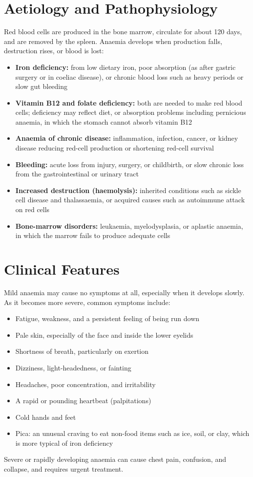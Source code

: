 \section*{Aetiology and Pathophysiology}
Red blood cells are produced in the bone marrow, circulate for about 120 days, and are removed by the spleen. Anaemia develops when production falls, destruction rises, or blood is lost:
\begin{itemize}
    \item \textbf{Iron deficiency:} from low dietary iron, poor absorption (as after gastric surgery or in coeliac disease), or chronic blood loss such as heavy periods or slow gut bleeding
    \item \textbf{Vitamin B12 and folate deficiency:} both are needed to make red blood cells; deficiency may reflect diet, or absorption problems including pernicious anaemia, in which the stomach cannot absorb vitamin B12
    \item \textbf{Anaemia of chronic disease:} inflammation, infection, cancer, or kidney disease reducing red-cell production or shortening red-cell survival
    \item \textbf{Bleeding:} acute loss from injury, surgery, or childbirth, or slow chronic loss from the gastrointestinal or urinary tract
    \item \textbf{Increased destruction (haemolysis):} inherited conditions such as sickle cell disease and thalassaemia, or acquired causes such as autoimmune attack on red cells
    \item \textbf{Bone-marrow disorders:} leukaemia, myelodysplasia, or aplastic anaemia, in which the marrow fails to produce adequate cells
\end{itemize}

\section*{Clinical Features}
Mild anaemia may cause no symptoms at all, especially when it develops slowly. As it becomes more severe, common symptoms include:
\begin{itemize}
    \item Fatigue, weakness, and a persistent feeling of being run down
    \item Pale skin, especially of the face and inside the lower eyelids
    \item Shortness of breath, particularly on exertion
    \item Dizziness, light-headedness, or fainting
    \item Headaches, poor concentration, and irritability
    \item A rapid or pounding heartbeat (palpitations)
    \item Cold hands and feet
    \item Pica: an unusual craving to eat non-food items such as ice, soil, or clay, which is more typical of iron deficiency
\end{itemize}
Severe or rapidly developing anaemia can cause chest pain, confusion, and collapse, and requires urgent treatment.


